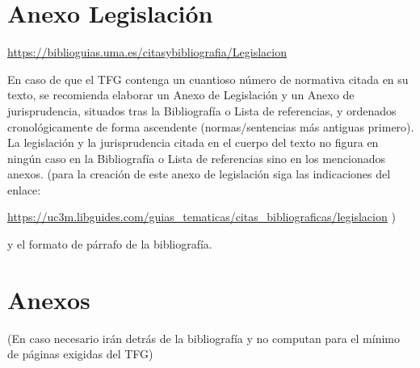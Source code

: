 \documentclass[13pt,a4paper]{report}
\begin{document}
\section{Anexo Legislación}


\href{https://biblioguias.uma.es/citasybibliografia/Legislacion}{https://biblioguias.uma.es/citasybibliografia/Legislacion} 


En caso de que el TFG contenga un cuantioso número de normativa citada en su texto, se recomienda elaborar un Anexo de Legislación y un Anexo de jurisprudencia, situados tras la Bibliografía o Lista de referencias, y ordenados cronológicamente de forma ascendente (normas/sentencias más antiguas primero). La legislación y la jurisprudencia citada en el cuerpo del texto no figura en ningún caso en la Bibliografía o Lista de referencias sino en los mencionados anexos.
(para la creación de este anexo de legislación siga las indicaciones del enlace:


\href{https://uc3m.libguides.com/guias\_tematicas/citas\_bibliograficas/legislacion}{https://uc3m.libguides.com/guias\_tematicas/citas\_bibliograficas/legislacion}
 ) 

 
y el formato de párrafo de la bibliografía.

\section{Anexos}

(En caso necesario irán detrás de la bibliografía y no computan para el mínimo de páginas exigidas del TFG)
\end{document}
